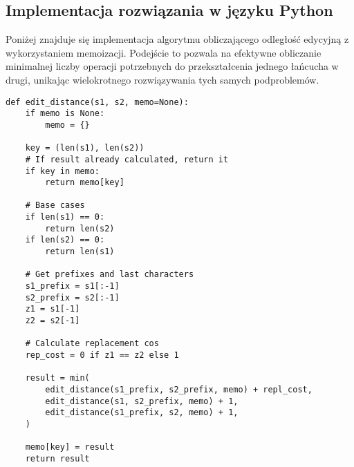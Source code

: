 \subsection{Implementacja rozwiązania w języku Python}
Poniżej znajduje się implementacja algorytmu obliczającego odległość edycyjną z wykorzystaniem memoizacji. Podejście to pozwala na efektywne obliczanie minimalnej liczby operacji potrzebnych do przekształcenia jednego łańcucha w drugi, unikając wielokrotnego rozwiązywania tych samych podproblemów.

\begin{verbatim}
def edit_distance(s1, s2, memo=None):
    if memo is None:
        memo = {}
    
    key = (len(s1), len(s2))
    # If result already calculated, return it
    if key in memo:
        return memo[key]
        
    # Base cases
    if len(s1) == 0:
        return len(s2)
    if len(s2) == 0:
        return len(s1)
        
    # Get prefixes and last characters
    s1_prefix = s1[:-1]
    s2_prefix = s2[:-1]
    z1 = s1[-1]
    z2 = s2[-1]

    # Calculate replacement cos
    rep_cost = 0 if z1 == z2 else 1
    
    result = min(
        edit_distance(s1_prefix, s2_prefix, memo) + repl_cost,
        edit_distance(s1, s2_prefix, memo) + 1,
        edit_distance(s1_prefix, s2, memo) + 1,
    )
    
    memo[key] = result
    return result
\end{verbatim}